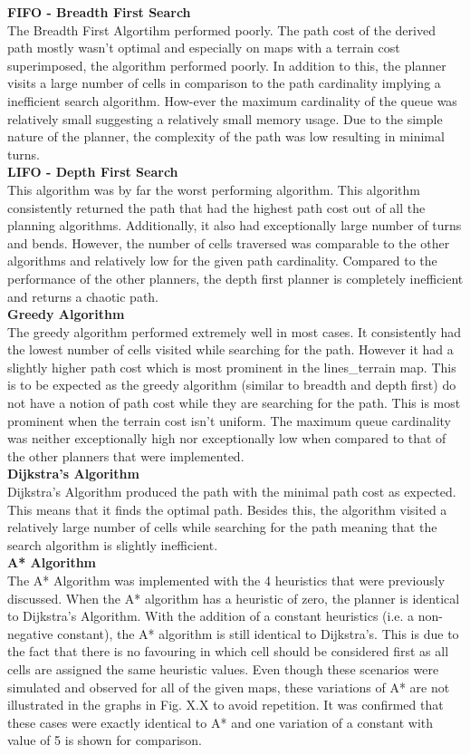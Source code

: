 \documentclass[a4paper,12pt]{article}
\begin{document}
				\textbf{FIFO - Breadth First Search}
				\\
				The Breadth First Algortihm performed poorly. The path cost of the derived path mostly wasn't optimal and especially on maps with a terrain cost superimposed, the algorithm performed poorly. In addition to this, the planner visits a large number of cells in comparison to the path cardinality implying a inefficient search algorithm. How-ever the maximum cardinality of the queue was relatively small suggesting a relatively small memory usage. Due to the simple nature of the planner, the complexity of the path was low resulting in minimal turns.
				\\
				\textbf{LIFO - Depth First Search}
				\\
				This algorithm was by far the worst performing algorithm. This algorithm consistently returned the path that had the highest path cost out of all the planning algorithms. Additionally, it also had exceptionally large number of turns and bends. However, the number of cells traversed was comparable to the other algorithms and relatively low for the given path cardinality. Compared to the performance of the other planners, the depth first planner is completely inefficient and returns a chaotic path.
				\\
				\textbf{Greedy Algorithm}
				\\
				The greedy algorithm performed extremely well in most cases. It consistently had the lowest number of cells visited while searching for the path. However it had a slightly higher path cost which is most prominent in the lines\_terrain map. This is to be expected as the greedy algorithm (similar to breadth and depth first) do not have a notion of path cost while they are searching for the path. This is most prominent when the terrain cost isn't uniform. The maximum queue cardinality was neither exceptionally high nor exceptionally low when compared to that of the other planners that were implemented. 
				\\
				\textbf{Dijkstra's Algorithm}
				\\
				Dijkstra's Algorithm produced the path with the minimal path cost as expected. This means that it finds the optimal path. Besides this, the algorithm visited a relatively large number of cells while searching for the path meaning that the search algorithm is slightly inefficient. 
				\\
				\textbf{A* Algorithm}
				\\ 
				The A* Algorithm was implemented with the 4 heuristics that were previously discussed. When the A* algorithm has a heuristic of zero, the planner is identical to Dijkstra's Algorithm. With the addition of a constant heuristics (i.e. a non-negative constant), the A* algorithm is still identical to Dijkstra's. This is due to the fact that there is no favouring in which cell should be considered first as all cells are assigned the same heuristic values. Even though these scenarios were simulated and observed for all of the given maps, these variations of A* are not illustrated in the graphs in Fig. X.X to avoid repetition. It was confirmed that these cases were exactly identical to A* and one variation of a constant with value of 5 is shown for comparison.
\end{document}
